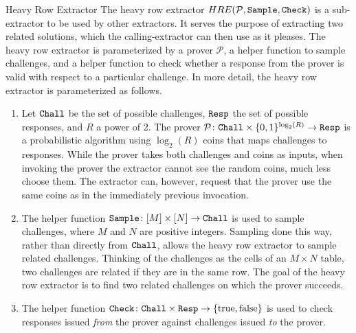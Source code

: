 \begin{theorem}{Heavy Row Extractor}
    The heavy row extractor $HRE(\mathcal{P},\mathtt{Sample},\mathtt{Check})$ is a sub-extractor to be used by other extractors.
    It serves the purpose of extracting two related solutions, which the calling-extractor can then use as it pleases.
    The heavy row extractor is parameterized by a prover $\mathcal{P}$, a helper function to sample challenges, and a helper function to check whether a response from the prover is valid with respect to a particular challenge.
    In more detail, the heavy row extractor is parameterized as follows.
    \begin{enumerate}
        \item
        Let $\mathtt{Chall}$ be the set of possible challenges, $\mathtt{Resp}$ the set of possible responses, and $R$ a power of 2.
        The prover $\mathcal{P}\colon\mathtt{Chall}\times\{0,1\}^{\log_2(R)}\to\mathtt{Resp}$ is a probabilistic algorithm using $\log_2(R)$ coins that maps challenges to responses.
        While the prover takes both challenges and coins as inputs, when invoking the prover the extractor cannot see the random coins, much less choose them.
        The extractor can, however, request that the prover use the same coins as in the immediately previous invocation.

        \item
        The helper function $\mathtt{Sample}\colon[M]\times[N]\to\mathtt{Chall}$ is used to sample challenges, where $M$ and $N$ are positive integers.
        Sampling done this way, rather than directly from $\mathtt{Chall}$, allows the heavy row extractor to sample related challenges.
        Thinking of the challenges as the cells of an $M\times N$ table, two challenges are related if they are in the same row.
        The goal of the heavy row extractor is to find two related challenges on which the prover succeeds.

        \item
        The helper function $\mathtt{Check}\colon\mathtt{Chall}\times\mathtt{Resp}\to\{\text{true},\text{false}\}$ is used to check responses issued \emph{from} the prover against challenges issued \emph{to} the prover.
    \end{enumerate}


\end{theorem}
